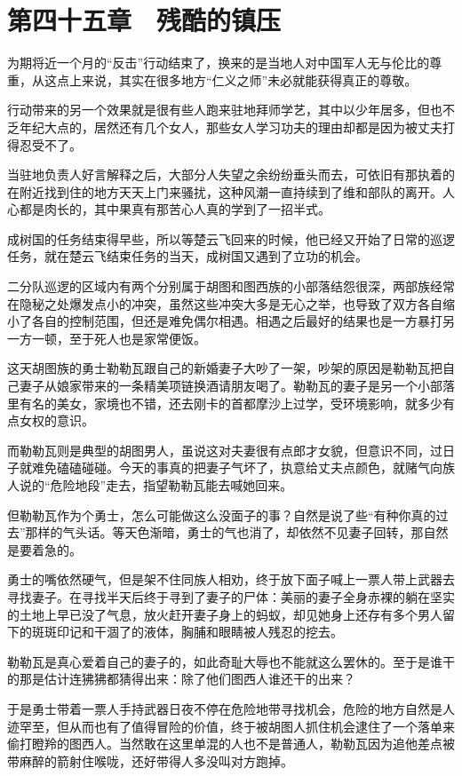 \section{第四十五章　残酷的镇压}

为期将近一个月的“反击”行动结束了，换来的是当地人对中国军人无与伦比的尊重，从这点上来说，其实在很多地方“仁义之师”未必就能获得真正的尊敬。

行动带来的另一个效果就是很有些人跑来驻地拜师学艺，其中以少年居多，但也不乏年纪大点的，居然还有几个女人，那些女人学习功夫的理由却都是因为被丈夫打得忍受不了。

当驻地负责人好言解释之后，大部分人失望之余纷纷垂头而去，可依旧有那执着的在附近找到住的地方天天上门来骚扰，这种风潮一直持续到了维和部队的离开。人心都是肉长的，其中果真有那苦心人真的学到了一招半式。

成树国的任务结束得早些，所以等楚云飞回来的时候，他已经又开始了日常的巡逻任务，就在楚云飞结束任务的当天，成树国又遇到了立功的机会。

二分队巡逻的区域内有两个分别属于胡图和图西族的小部落结怨很深，两部族经常在隐秘之处爆发点小的冲突，虽然这些冲突大多是无心之举，也导致了双方各自缩小了各自的控制范围，但还是难免偶尔相遇。相遇之后最好的结果也是一方暴打另一方一顿，至于死人也是家常便饭。

这天胡图族的勇士勒勒瓦跟自己的新婚妻子大吵了一架，吵架的原因是勒勒瓦把自己妻子从娘家带来的一条精美项链换酒请朋友喝了。勒勒瓦的妻子是另一个小部落里有名的美女，家境也不错，还去刚卡的首都摩沙上过学，受环境影响，就多少有点女权的意识。

而勒勒瓦则是典型的胡图男人，虽说这对夫妻很有点郎才女貌，但意识不同，过日子就难免磕磕碰碰。今天的事真的把妻子气坏了，执意给丈夫点颜色，就赌气向族人说的“危险地段”走去，指望勒勒瓦能去喊她回来。

但勒勒瓦作为个勇士，怎么可能做这么没面子的事？自然是说了些“有种你真的过去”那样的气头话。等天色渐暗，勇士的气也消了，却依然不见妻子回转，那自然是要着急的。

勇士的嘴依然硬气，但是架不住同族人相劝，终于放下面子喊上一票人带上武器去寻找妻子。在寻找半天后终于寻到了妻子的尸体：美丽的妻子全身赤裸的躺在坚实的土地上早已没了气息，放火赶开妻子身上的蚂蚁，却见她身上还存有多个男人留下的斑斑印记和干涸了的液体，胸脯和眼睛被人残忍的挖去。

勒勒瓦是真心爱着自己的妻子的，如此奇耻大辱也不能就这么罢休的。至于是谁干的那是估计连狒狒都猜得出来：除了他们图西人谁还干的出来？

于是勇士带着一票人手持武器日夜不停在危险地带寻找机会，危险的地方自然是人迹罕至，但从而也有了值得冒险的价值，终于被胡图人抓住机会逮住了一个落单来偷打瞪羚的图西人。当然敢在这里单混的人也不是普通人，勒勒瓦因为追他差点被带麻醉的箭射住喉咙，还好带得人多没叫对方跑掉。

